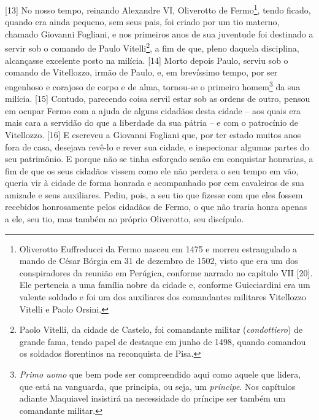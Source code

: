 {[}13{]} No nosso tempo, reinando Alexandre VI, Oliverotto de
Fermo\footnote{Oliverotto Euffreducci da Fermo nasceu em 1475 e morreu
  estrangulado a mando de César Bórgia em 31 de dezembro de 1502, visto
  que era um dos conspiradores da reunião em Perúgica, conforme narrado
  no capítulo VII {[}20{]}. Ele pertencia a uma família nobre da cidade
  e, conforme Guicciardini era um valente soldado e foi um dos
  auxiliares dos comandantes militares Vitellozzo Vitelli e Paolo
  Orsini.}, tendo ficado, quando era ainda pequeno, sem seus pais, foi
criado por um tio materno, chamado Giovanni Fogliani, e nos primeiros
anos de sua juventude foi destinado a servir sob o comando de Paulo
Vitelli\footnote{Paolo Vitelli, da cidade de Castelo, foi comandante
  militar (\emph{condottiero}) de grande fama, tendo papel de destaque
  em junho de 1498, quando comandou os soldados florentinos na
  reconquista de Pisa.}, a fim de que, pleno daquela disciplina,
alcançasse excelente posto na milícia. {[}14{]} Morto depois Paulo,
serviu sob o comando de Vitellozzo, irmão de Paulo, e, em brevíssimo
tempo, por ser engenhoso e corajoso de corpo e de alma, tornou-se o
primeiro homem\footnote{\emph{Primo uomo} que bem pode ser compreendido
  aqui como aquele que lidera, que está na vanguarda, que principia, ou
  seja, um \emph{príncipe}. Nos capítulos adiante Maquiavel insistirá na
  necessidade do príncipe ser também um comandante militar.} da sua
milícia. {[}15{]} Contudo, parecendo coisa servil estar sob as ordens de
outro, pensou em ocupar Fermo com a ajuda de alguns cidadãos desta
cidade -- aos quais era mais cara a servidão do que a liberdade da sua
pátria -- e com o patrocínio de Vitellozzo. {[}16{]} E escreveu a
Giovanni Fogliani que, por ter estado muitos anos fora de casa, desejava
revê-lo e rever sua cidade, e inspecionar algumas partes do seu
patrimônio. E porque não se tinha esforçado senão em conquistar
honrarias, a fim de que os seus cidadãos vissem como ele não perdera o
seu tempo em vão, queria vir à cidade de forma honrada e acompanhado por
cem cavaleiros de sua amizade e seus auxiliares. Pediu, pois, a seu tio
que fizesse com que eles fossem recebidos honrosamente pelos cidadãos de
Fermo, o que não traria honra apenas a ele, seu tio, mas também ao
próprio Oliverotto, seu discípulo.

